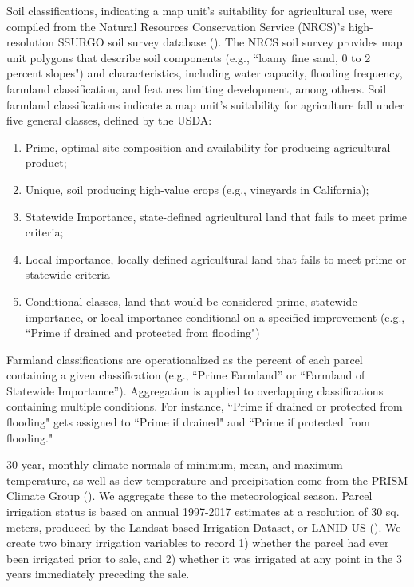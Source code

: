 \documentclass[12pt]{article}
\begin{document}
Soil classifications, indicating a map unit's suitability for agricultural use, were compiled from the Natural Resources Conservation Service (NRCS)’s high-resolution SSURGO soil survey database (\cite{SoilSurveyStaffSoilStates}). The NRCS soil survey provides map unit polygons that describe soil components (e.g., ``loamy fine sand, 0 to 2 percent slopes") and characteristics, including water capacity, flooding frequency, farmland classification, and features limiting development, among others. Soil farmland classifications indicate a map unit's suitability for agriculture fall under five general classes, defined by the USDA:
\begin{enumerate}
    \item Prime, optimal site composition and availability for producing agricultural product;  
    \item Unique, soil producing high-value crops (e.g., vineyards in California); 
    \item Statewide Importance, state-defined agricultural land that fails to meet prime criteria;
    \item Local importance, locally defined agricultural land that fails to meet prime or statewide criteria
    \item Conditional classes, land that would be considered prime, statewide importance, or local importance conditional on a specified improvement (e.g., ``Prime if drained and protected from flooding")
\end{enumerate}

Farmland classifications are operationalized as the percent of each parcel containing a given classification (e.g., ``Prime Farmland” or ``Farmland of Statewide Importance”). Aggregation is applied to overlapping classifications containing multiple conditions. For instance, ``Prime if drained or protected from flooding" gets assigned to ``Prime if drained" and ``Prime if protected from flooding." 

30-year, monthly climate normals of minimum, mean, and maximum temperature, as well as dew temperature and precipitation come from the PRISM Climate Group (\cite{PRISMClimate2021}). We aggregate these to the meteorological season. Parcel irrigation status is based on annual 1997-2017 estimates at a resolution of 30 sq. meters, produced by the Landsat-based Irrigation Dataset, or LANID-US (\cite{Xie2021MappingStates}). We create two binary irrigation variables to record 1) whether the parcel had ever been irrigated prior to sale, and 2) whether it was irrigated at any point in the 3 years immediately preceding the sale. 
\end{document}
